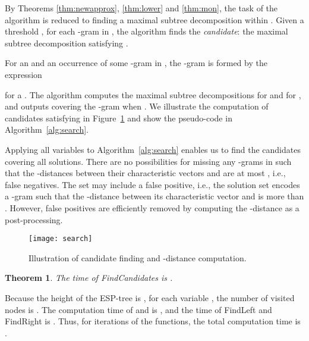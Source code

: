\documentclass[12pt,a4paper]{scrartcl}
\newtheorem{Theorem}{Theorem}
\newenvironment{Proof}{\trivlist \item[\hskip \labelsep{\bf proof.\/}]}{\hspace{\fill}\endtrivlist }
\begin{document}
By Theorems \ref{thm:newapprox}, \ref{thm:lower} and \ref{thm:mon},
the task of the algorithm is reduced to finding a maximal subtree
decomposition  within .  Given
a threshold , for each -gram in ,
the algorithm finds the \emph{candidate}: the maximal subtree
decomposition  satisfying
.

For an  and an occurrence of some -gram in ,
the -gram is formed by the expression

for a  .  
The algorithm computes the maximal
subtree decompositions  for 
 and
 for
, and outputs
 covering the -gram when
.
We illustrate the computation of candidates satisfying 
 in Figure~\ref{fig:search}
and show the pseudo-code in Algorithm~\ref{alg:search}.

Applying all variables to Algorithm~\ref{alg:search} enables us to
find the candidates covering all solutions.  There are no
possibilities for missing any -grams in  such
that the -distances between their characteristic vectors and
 are at most , i.e., false negatives.  The set may include
a false positive, i.e., the solution set encodes a -gram such
that the -distance between its characteristic vector and 
is more than .  However, false positives are efficiently removed
by computing the -distance
 as a post-processing.

\begin{figure}
\begin{center}
\texttt{[image: search]}
\caption{Illustration of candidate finding and -distance computation.}
\label{fig:search}
\end{center}
\end{figure}


\begin{Theorem}\label{thm:fc}
The time of {\sc FindCandidates} is .
\end{Theorem}
\begin{Proof}
Because the height of the ESP-tree is , 
for each variable , the number of visited nodes is .
The computation time of  and  is , and the
time of {\sc FindLeft} and {\sc FindRight} is .
Thus, for  iterations of the functions, the total computation time is .
\end{Proof}
\end{document}
